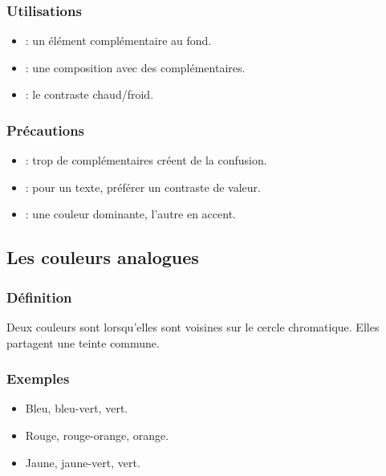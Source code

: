 \subsubsection{Utilisations}

\begin{itemize}
    \item {} : un élément complémentaire au fond.
    \item {} : une composition avec des complémentaires.
    \item {} : le contraste chaud/froid.
\end{itemize}

\subsubsection{Précautions}

\begin{itemize}
    \item {} : trop de complémentaires créent de la confusion.
    \item {} : pour un texte, préférer un contraste de valeur.
    \item {} : une couleur dominante, l'autre en accent.
\end{itemize}

\subsection{Les couleurs analogues}

\subsubsection{Définition}

Deux couleurs sont  lorsqu'elles sont voisines sur le cercle chromatique. Elles partagent une teinte commune.

\subsubsection{Exemples}

\begin{itemize}
    \item Bleu, bleu-vert, vert.
    \item Rouge, rouge-orange, orange.
    \item Jaune, jaune-vert, vert.
\end{itemize}

